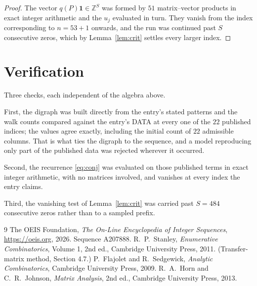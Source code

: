 \documentclass[11pt,a4paper]{article}
\theoremstyle{plain}
\theoremstyle{definition}
\begin{document}
\begin{proof}
The vector $q(P)\mathbf{1}\in\mathbb{Z}^{S}$ was formed by $51$ matrix--vector
products in exact integer arithmetic and the $u_j$ evaluated in turn. They vanish from the
index corresponding to $n=53+1$ onwards, and the run was continued past $S$ consecutive
zeros, which by Lemma~\ref{lem:crit} settles every larger index.
\end{proof}

\section{Verification}

Three checks, each independent of the algebra above.

First, the digraph was built directly from the entry's stated patterns and the walk counts
compared against the entry's DATA at every one of the $22$ published indices; the
values agree exactly, including the initial count of $22$ admissible columns. That is
what ties the digraph to the sequence, and a model reproducing only part of the published
data was rejected wherever it occurred.

Second, the recurrence \eqref{eq:conj} was evaluated on those published terms in exact
integer arithmetic, with no matrices involved, and vanishes at every index the entry claims.

Third, the vanishing test of Lemma~\ref{lem:crit} was carried past $S=484$ consecutive
zeros rather than to a sampled prefix.

\begin{thebibliography}{9}
 The OEIS Foundation, \emph{The On-Line Encyclopedia of Integer
Sequences}, \url{https://oeis.org}, 2026. Sequence A207888.
 R.~P.~Stanley, \emph{Enumerative Combinatorics}, Volume 1, 2nd ed.,
Cambridge University Press, 2011. (Transfer-matrix method, Section 4.7.)
 P.~Flajolet and R.~Sedgewick, \emph{Analytic Combinatorics}, Cambridge
University Press, 2009.
 R.~A.~Horn and C.~R.~Johnson, \emph{Matrix Analysis}, 2nd ed., Cambridge
University Press, 2013.
\end{thebibliography}
\end{document}
